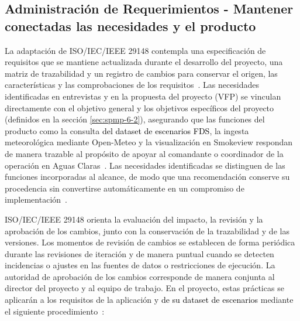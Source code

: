 \subsection{Administración de Requerimientos - Mantener conectadas las necesidades y el producto}\label{sec:spmp-10-1}

La adaptación de ISO/IEC/IEEE 29148 contempla una especificación de requisitos que se mantiene actualizada durante el desarrollo del proyecto, una matriz de trazabilidad y un registro de cambios para conservar el origen, las características y las comprobaciones de los requisitos~\cite{std29148}. Las necesidades identificadas en entrevistas y en la propuesta del proyecto (VFP) se vinculan directamente con el objetivo general y los objetivos específicos del proyecto (definidos en la sección \ref{sec:spmp-6-2}), asegurando que las funciones del producto como la consulta \textcolor{black}{del dataset de escenarios FDS}, la ingesta meteorológica mediante Open-Meteo y la visualización en Smokeview respondan de manera trazable al propósito de apoyar al comandante o coordinador de la operación en Aguas Claras~\cite{vfp2026,adaptacion2026,std29148}. Las necesidades identificadas se distinguen de las funciones incorporadas al alcance, de modo que una recomendación conserve su procedencia sin convertirse automáticamente en un compromiso de implementación~\cite{adaptacion2026,std29148}.

ISO/IEC/IEEE 29148 orienta la evaluación del impacto, la revisión y la aprobación de los cambios, junto con la conservación de la trazabilidad y de las versiones. Los momentos de revisión de cambios se establecen de forma periódica durante las revisiones de iteración y de manera puntual cuando se detecten incidencias o ajustes en las fuentes de datos o restricciones de ejecución. La autoridad de aprobación de los cambios corresponde de manera conjunta al director del proyecto y al equipo de trabajo. En el proyecto, estas prácticas se aplicarán a los requisitos de la aplicación y \textcolor{black}{de su dataset de escenarios} mediante el siguiente procedimiento~\cite{std29148}:

